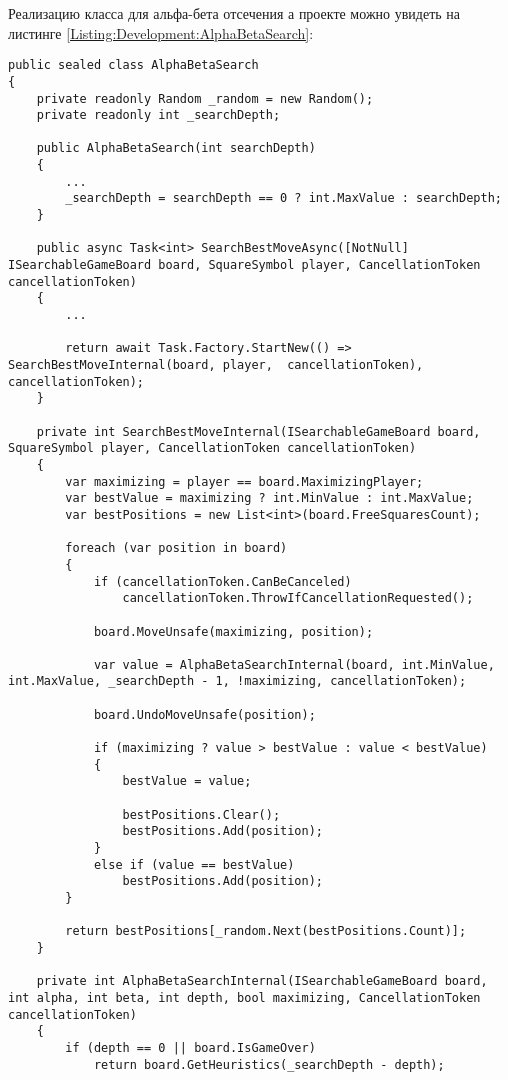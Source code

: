 Реализацию класса для альфа-бета отсечения а проекте можно увидеть на листинге \ref{Listing:Development:AlphaBetaSearch}:

\begin{lstlisting}[caption={Реализация алгоритма альфа-бета отсечения}, label=Listing:Development:AlphaBetaSearch]
public sealed class AlphaBetaSearch
{
    private readonly Random _random = new Random();
    private readonly int _searchDepth;

    public AlphaBetaSearch(int searchDepth)
    {
        ...
        _searchDepth = searchDepth == 0 ? int.MaxValue : searchDepth;
    }

    public async Task<int> SearchBestMoveAsync([NotNull] ISearchableGameBoard board, SquareSymbol player, CancellationToken cancellationToken)
    {
        ...

        return await Task.Factory.StartNew(() => SearchBestMoveInternal(board, player,  cancellationToken), cancellationToken);
    }

    private int SearchBestMoveInternal(ISearchableGameBoard board, SquareSymbol player, CancellationToken cancellationToken)
    {
        var maximizing = player == board.MaximizingPlayer;
        var bestValue = maximizing ? int.MinValue : int.MaxValue;
        var bestPositions = new List<int>(board.FreeSquaresCount);

        foreach (var position in board)
        {
            if (cancellationToken.CanBeCanceled)
                cancellationToken.ThrowIfCancellationRequested();

            board.MoveUnsafe(maximizing, position);

            var value = AlphaBetaSearchInternal(board, int.MinValue, int.MaxValue, _searchDepth - 1, !maximizing, cancellationToken);

            board.UndoMoveUnsafe(position);

            if (maximizing ? value > bestValue : value < bestValue)
            {
                bestValue = value;

                bestPositions.Clear();
                bestPositions.Add(position);
            }
            else if (value == bestValue)
                bestPositions.Add(position);
        }

        return bestPositions[_random.Next(bestPositions.Count)];
    }

    private int AlphaBetaSearchInternal(ISearchableGameBoard board, int alpha, int beta, int depth, bool maximizing, CancellationToken cancellationToken)
    {
        if (depth == 0 || board.IsGameOver)
            return board.GetHeuristics(_searchDepth - depth);


\end{lstlisting}

